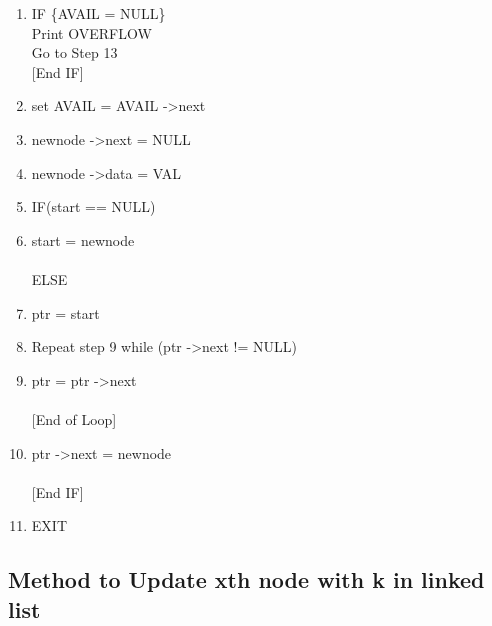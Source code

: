 \documentclass[a4paper,12pt]{article}
\begin{document}
\begin{enumerate}[Step 1:]
\item IF \{AVAIL = NULL\}\\
\hspace*{6mm}   Print OVERFLOW  \\    
\hspace*{6mm}   Go to Step 13
\\ \hspace*{1mm} [End IF]
\item set AVAIL =  AVAIL -\textgreater  next
\item newnode -\textgreater  next = NULL
\item  newnode -\textgreater  data = VAL
\item IF(start == NULL)\\
\item \hspace*{6mm}    start = newnode\\
\\ \hspace*{1mm} ELSE
\item  \hspace*{5mm} ptr = start
\item  \hspace*{5mm}Repeat step 9 while (ptr -\textgreater  next != NULL)
\item  \hspace*{15mm} ptr = ptr -\textgreater  next\\
 \\ \hspace*{5mm} [End of Loop]
\item \hspace*{5mm} ptr -\textgreater  next = newnode\\
\\ \hspace*{1mm} [End IF]
\item EXIT

\end{enumerate}

\newpage

\subsection*{Method to Update xth node with k in linked list}
\end{document}
